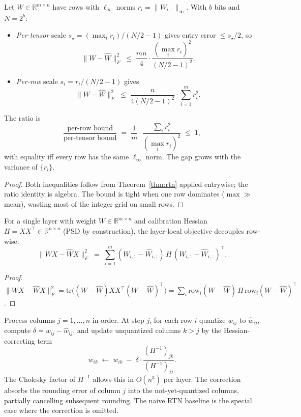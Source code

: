 \begin{theorem}\label{thm:perrow}
Let $W\in\mathbb{R}^{m\times n}$ have rows with $\ell_\infty$ norms $r_i = \|W_{i,:}\|_\infty$. With $b$ bits and $N=2^b$:
\begin{itemize}
\item \emph{Per-tensor} scale $s_\star = (\max_i r_i)/(N/2-1)$ gives entry error $\le s_\star/2$, so
\[
\|W-\widehat W\|_F^2 \;\le\; \frac{mn}{4}\cdot\frac{(\max_i r_i)^2}{(N/2-1)^2}.
\]
\item \emph{Per-row} scale $s_i = r_i/(N/2-1)$ gives
\[
\|W-\widehat W\|_F^2 \;\le\; \frac{n}{4(N/2-1)^2}\cdot\sum_{i=1}^m r_i^2.
\]
\end{itemize}
The ratio is
\[
\frac{\text{per-row bound}}{\text{per-tensor bound}} \;=\; \frac{1}{m}\cdot\frac{\sum_i r_i^2}{(\max_i r_i)^2} \;\le\; 1,
\]
with equality iff every row has the same $\ell_\infty$ norm. The gap grows with the variance of $\{r_i\}$.
\end{theorem}

\begin{proof}
Both inequalities follow from Theorem~\ref{thm:rtn} applied entrywise; the ratio identity is algebra. The bound is tight when one row dominates ($\max\gg$ mean), wasting most of the integer grid on small rows.
\end{proof}

\begin{theorem}\label{thm:gptq}
For a single layer with weight $W\in\mathbb{R}^{m\times n}$ and calibration Hessian $H = XX^\top \in \mathbb{R}^{n\times n}$ (PSD by construction), the layer-local objective decouples row-wise:
\[
\big\|WX-\widehat W X\big\|_F^2 \;=\; \sum_{i=1}^m (W_{i,:} - \widehat W_{i,:})\, H\, (W_{i,:} - \widehat W_{i,:})^\top.
\]
\end{theorem}

\begin{proof}
$\|WX - \widehat W X\|_F^2 = \mathrm{tr}\big((W-\widehat W)XX^\top(W-\widehat W)^\top\big) = \sum_i \mathrm{row}_i(W-\widehat W)\,H\,\mathrm{row}_i(W-\widehat W)^\top$.
\end{proof}

\begin{remark}
Process columns $j=1,\dots,n$ in order. At step $j$, for each row $i$ quantize $w_{ij}$ to $\widehat w_{ij}$, compute $\delta = w_{ij}-\widehat w_{ij}$, and update unquantized columns $k>j$ by the Hessian-correcting term
\[
w_{ik} \;\leftarrow\; w_{ik} \;-\; \delta\cdot \frac{(H^{-1})_{jk}}{(H^{-1})_{jj}}.
\]
The Cholesky factor of $H^{-1}$ allows this in $O(n^3)$ per layer. The correction absorbs the rounding error of column $j$ into the not-yet-quantized columns, partially cancelling subsequent rounding. The naive RTN baseline is the special case where the correction is omitted.
\end{remark}

